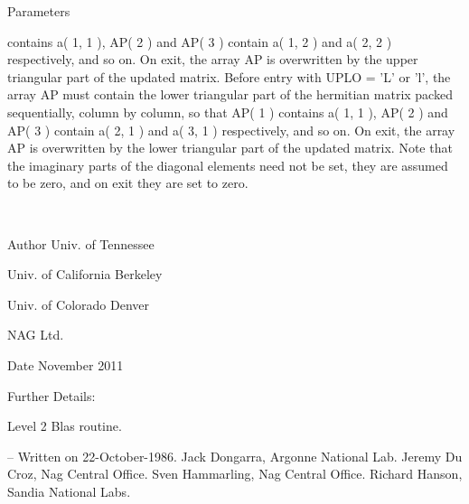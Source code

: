 \begin{DoxyParams}[1]{Parameters}
\begin{DoxyVerb}
           contains a( 1, 1 ), AP( 2 ) and AP( 3 ) contain a( 1, 2 )
           and a( 2, 2 ) respectively, and so on. On exit, the array
           AP is overwritten by the upper triangular part of the
           updated matrix.
           Before entry with UPLO = 'L' or 'l', the array AP must
           contain the lower triangular part of the hermitian matrix
           packed sequentially, column by column, so that AP( 1 )
           contains a( 1, 1 ), AP( 2 ) and AP( 3 ) contain a( 2, 1 )
           and a( 3, 1 ) respectively, and so on. On exit, the array
           AP is overwritten by the lower triangular part of the
           updated matrix.
           Note that the imaginary parts of the diagonal elements need
           not be set, they are assumed to be zero, and on exit they
           are set to zero.\end{DoxyVerb}
 \\
\hline
\end{DoxyParams}
\begin{DoxyAuthor}{Author}
Univ. of Tennessee 

Univ. of California Berkeley 

Univ. of Colorado Denver 

N\+A\+G Ltd. 
\end{DoxyAuthor}
\begin{DoxyDate}{Date}
November 2011 
\end{DoxyDate}
\begin{DoxyParagraph}{Further Details\+: }
\begin{DoxyVerb}  Level 2 Blas routine.

  -- Written on 22-October-1986.
     Jack Dongarra, Argonne National Lab.
     Jeremy Du Croz, Nag Central Office.
     Sven Hammarling, Nag Central Office.
     Richard Hanson, Sandia National Labs.\end{DoxyVerb}
 
\end{DoxyParagraph}
\hypertarget{group__complex16__blas__level2_ga2eb62f52e98a997e5f88f86d53cd0d4f}{}
